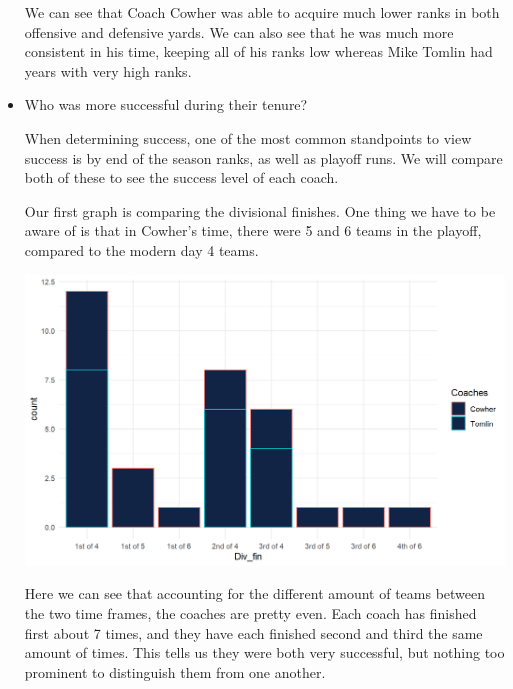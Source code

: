 \documentclass[
  letterpaper,
  DIV=11,
  numbers=noendperiod]{scrartcl}
\begin{document}
\begin{itemize}
  We can see that Coach Cowher was able to acquire much lower ranks in
  both offensive and defensive yards. We can also see that he was much
  more consistent in his time, keeping all of his ranks low whereas Mike
  Tomlin had years with very high ranks.
\item
  Who was more successful during their tenure?

  When determining success, one of the most common standpoints to view
  success is by end of the season ranks, as well as playoff runs. We
  will compare both of these to see the success level of each coach.

  Our first graph is comparing the divisional finishes. One thing we
  have to be aware of is that in Cowher's time, there were 5 and 6 teams
  in the playoff, compared to the modern day 4 teams.

  \includegraphics{images/clipboard-1894425753.png}

  Here we can see that accounting for the different amount of teams
  between the two time frames, the coaches are pretty even. Each coach
  has finished first about 7 times, and they have each finished second
  and third the same amount of times. This tells us they were both very
  successful, but nothing too prominent to distinguish them from one
  another.


\end{itemize}
\end{document}
